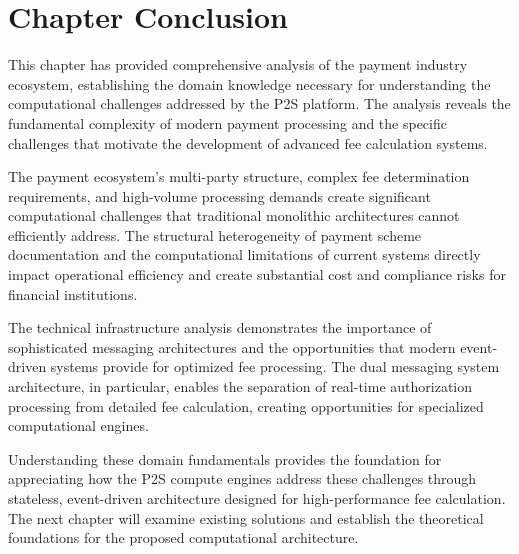\section{Chapter Conclusion}

This chapter has provided comprehensive analysis of the payment industry ecosystem, establishing the domain knowledge necessary for understanding the computational challenges addressed by the P2S platform. The analysis reveals the fundamental complexity of modern payment processing and the specific challenges that motivate the development of advanced fee calculation systems.

The payment ecosystem's multi-party structure, complex fee determination requirements, and high-volume processing demands create significant computational challenges that traditional monolithic architectures cannot efficiently address. The structural heterogeneity of payment scheme documentation and the computational limitations of current systems directly impact operational efficiency and create substantial cost and compliance risks for financial institutions.

The technical infrastructure analysis demonstrates the importance of sophisticated messaging architectures and the opportunities that modern event-driven systems provide for optimized fee processing. The dual messaging system architecture, in particular, enables the separation of real-time authorization processing from detailed fee calculation, creating opportunities for specialized computational engines.

Understanding these domain fundamentals provides the foundation for appreciating how the P2S compute engines address these challenges through stateless, event-driven architecture designed for high-performance fee calculation. The next chapter will examine existing solutions and establish the theoretical foundations for the proposed computational architecture.